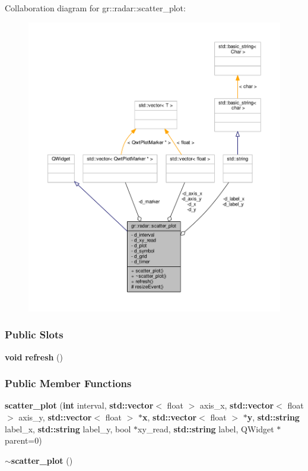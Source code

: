 Collaboration diagram for gr\+:\+:radar\+:\+:scatter\+\_\+plot\+:
\nopagebreak
\begin{figure}[H]
\begin{center}
\leavevmode
\includegraphics[width=350pt]{da/d1e/classgr_1_1radar_1_1scatter__plot__coll__graph}
\end{center}
\end{figure}
\subsubsection*{Public Slots}
\begin{DoxyCompactItemize}
\item 
{\bf void} {\bf refresh} ()
\end{DoxyCompactItemize}
\subsubsection*{Public Member Functions}
\begin{DoxyCompactItemize}
\item 
{\bf scatter\+\_\+plot} ({\bf int} interval, {\bf std\+::vector}$<$ float $>$ axis\+\_\+x, {\bf std\+::vector}$<$ float $>$ axis\+\_\+y, {\bf std\+::vector}$<$ float $>$ $\ast${\bf x}, {\bf std\+::vector}$<$ float $>$ $\ast${\bf y}, {\bf std\+::string} label\+\_\+x, {\bf std\+::string} label\+\_\+y, bool $\ast$xy\+\_\+read, {\bf std\+::string} label, Q\+Widget $\ast$parent=0)
\item 
{\bf $\sim$scatter\+\_\+plot} ()
\end{DoxyCompactItemize}
